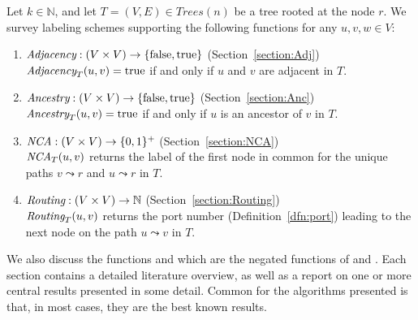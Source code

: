Let $k \in \mathbb{N}$, and let $T=(V,E)  \in Trees(n)$  be a tree rooted at the node $r$.
We survey labeling  schemes supporting  the following functions for any  $u,v,w \in V$:
	\begin{enumerate}
	  \setlength{\itemsep}{2pt}
	\item $\emph{Adjacency}:(V \times V) \rightarrow \{ \mathrm{false}, \mathrm{true}\}$ (Section~\ref{section:Adj})  			 \\ $\emph{Adjacency}_T(u,v) =  \mathrm{true}$ if and only if $u$ and $v$ are adjacent in $T$. 
	\item $\emph{Ancestry}: (V \times V) \rightarrow \{ \mathrm{false}, \mathrm{true}\}$    (Section~\ref{section:Anc})  		  \\ $\emph{Ancestry}_T(u,v) =  \mathrm{true}$ if and only if $u$ is an ancestor of $v$ in $T$.
	\item $\emph{NCA}: (V \times V) \rightarrow \{ 0,1 \}^+$       (Section~\ref{section:NCA})  			\\  $\emph{NCA}_T(u,v)$ returns the label of the first node in common for the unique paths  $v \leadsto r $ and $u \leadsto r$ in $T$. 
	\item $\emph{Routing}: (V \times V) \rightarrow  \mathbb{N} $        (Section~\ref{section:Routing})  					\\  $\emph{Routing}_T(u,v)$ returns the port number (Definition~\ref{dfn:port}) leading to the next node on the  path  $u \leadsto v$ in $T$.
	\end{enumerate}
We also discuss the functions \nonadjacency and \nonancestry which are the negated functions of \adjacency and \ancestry. Each section contains a detailed literature overview,  as well as a report on one or more central results presented in some detail. Common for the algorithms presented is that, in most cases, they are  the best known results.

